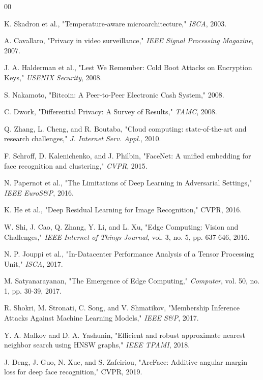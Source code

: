 \documentclass[conference]{IEEEtran}
\begin{document}
\begin{thebibliography}{00}

 K. Skadron et al., "Temperature-aware microarchitecture," \textit{ISCA}, 2003.

 A. Cavallaro, "Privacy in video surveillance," \textit{IEEE Signal Processing Magazine}, 2007.

 J. A. Halderman et al., "Lest We Remember: Cold Boot Attacks on Encryption Keys," \textit{USENIX Security}, 2008.

 S. Nakamoto, "Bitcoin: A Peer-to-Peer Electronic Cash System," 2008.

 C. Dwork, "Differential Privacy: A Survey of Results," \textit{TAMC}, 2008.

 Q. Zhang, L. Cheng, and R. Boutaba, "Cloud computing: state-of-the-art and research challenges," \textit{J. Internet Serv. Appl.}, 2010.

 F. Schroff, D. Kalenichenko, and J. Philbin, "FaceNet: A unified embedding for face recognition and clustering," \textit{CVPR}, 2015.

 N. Papernot et al., "The Limitations of Deep Learning in Adversarial Settings," \textit{IEEE EuroS\&P}, 2016.

 K. He et al., "Deep Residual Learning for Image Recognition," CVPR, 2016.

 W. Shi, J. Cao, Q. Zhang, Y. Li, and L. Xu, "Edge Computing: Vision and Challenges," \textit{IEEE Internet of Things Journal}, vol. 3, no. 5, pp. 637-646, 2016.

 N. P. Jouppi et al., "In-Datacenter Performance Analysis of a Tensor Processing Unit," \textit{ISCA}, 2017.

 M. Satyanarayanan, "The Emergence of Edge Computing," \textit{Computer}, vol. 50, no. 1, pp. 30-39, 2017.

 R. Shokri, M. Stronati, C. Song, and V. Shmatikov, "Membership Inference Attacks Against Machine Learning Models," \textit{IEEE S\&P}, 2017.

 Y. A. Malkov and D. A. Yashunin, "Efficient and robust approximate nearest neighbor search using HNSW graphs," \textit{IEEE TPAMI}, 2018.

 J. Deng, J. Guo, N. Xue, and S. Zafeiriou, "ArcFace: Additive angular margin loss for deep face recognition," CVPR, 2019.


\end{thebibliography}
\end{document}
